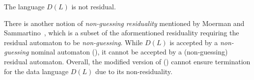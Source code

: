 \documentclass[a4paper,UKenglish,cleveref,autoref,thm-restate,numberwithinsect,final]{lipics-v2021}
\begin{document}
      \begin{corollary}
        The language $D(L)$ is not residual.
      \end{corollary}
      \begin{rem}
        There is another notion of \emph{non-guessing residuality} mentioned by Moerman and Sammartino~\cite{ms22},
        which is a subset of the aformentioned residuality requiring the residual automaton to be
        \emph{non-guessing}. While $D(L)$ is accepted by a \emph{non-guessing} nominal automaton (),
        it cannot be accepted by a (non-guessing) residual automaton. 
        Overall, the modified version of \nomNLstar (\cite{ms22}) cannot ensure termination for
        the data language $D(L)$ due to its non-residuality.
      \end{rem}
\end{document}
